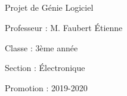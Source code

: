 \documentclass[a4paper,12pt]{report}
\begin{document}
\paragraph{}
Projet de Génie Logiciel \par 
Professeur  :   M. Faubert Étienne \par 
Classe      :   3ème année \par 
Section     :   Électronique \par 
Promotion   :   2019-2020
\tableofcontents

\chapter*{}













\end{document}
